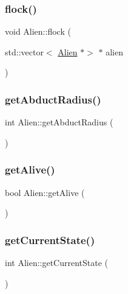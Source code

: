\subsubsection{\texorpdfstring{flock()}{flock()}}
{\footnotesize\ttfamily void Alien\+::flock (\begin{DoxyParamCaption}\item[{std\+::vector$<$ \hyperlink{class_alien}{Alien} $\ast$$>$ $\ast$}]{alien }\end{DoxyParamCaption})}

\mbox{\label{class_alien_a9dbe59b6c7ec7ad946e113f0f05f7427}} 
\subsubsection{\texorpdfstring{get\+Abduct\+Radius()}{getAbductRadius()}}
{\footnotesize\ttfamily int Alien\+::get\+Abduct\+Radius (\begin{DoxyParamCaption}{ }\end{DoxyParamCaption})}

\mbox{\label{class_alien_a6da0e947ec0c70d429e54511d67ad608}} 
\subsubsection{\texorpdfstring{get\+Alive()}{getAlive()}}
{\footnotesize\ttfamily bool Alien\+::get\+Alive (\begin{DoxyParamCaption}{ }\end{DoxyParamCaption})}

\mbox{\label{class_alien_a3165f3c2c824c3784dd0054d48fd5c5a}} 
\subsubsection{\texorpdfstring{get\+Current\+State()}{getCurrentState()}}
{\footnotesize\ttfamily int Alien\+::get\+Current\+State (\begin{DoxyParamCaption}{ }\end{DoxyParamCaption})}

